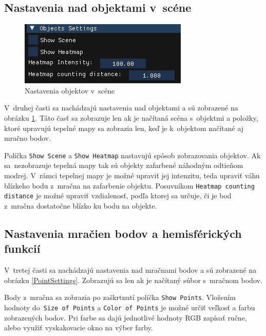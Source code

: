 \subsection*{Nastavenia nad objektami v~scéne}

\begin{figure}[t!] \label{ObjSettings}
    \centering
    \includegraphics[width=0.45\linewidth]{obrazky-figures/UI_scene.png}
    \caption{Nastavenia objektov v~scéne}
\end{figure}
V~druhej časti sa nachádzajú nastavenia nad objektami a sú zobrazené na obrázku \ref{ObjSettings}. Táto časť sa zobrazuje len ak je načítaná scéna s~objektmi a položky, ktoré upravujú tepelné mapy sa zobrazia len, keď je k~objektom načítané aj mračno bodov.

Políčka \verb|Show Scene| a \verb|Show Heatmap| nastavujú spôsob zobrazovania objektov. Ak sa~nezobrazuje tepelná mapy tak sú objekty zafarbené náhodným odtieňom modrej. V~rámci tepelnej mapy je možné upraviť jej intenzitu, teda upraviť váhu blízkeho bodu z~mračna na zafarbenie objektu. Posuvníkom \verb|Heatmap counting distance| je možné upraviť vzdialenosť, podľa ktorej sa určuje, či je bod z~mračna dostatočne blízko ku bodu na objekte.

\subsection*{Nastavenia mračien bodov a hemisférických funkcií}
V~tretej časti sa nachádzajú nastavenia nad mračnami bodov a sú zobrazené na obrázku \ref{PointSettings}. Zobrazujú sa len ak je načítaný súbor s~mračnom bodov. 

Body z~mračna sa zobrazia po zaškrtnutí políčka \verb|Show Points|. Vložením hodnoty do~\verb|Size of Points| a \verb|Color of Points| je možné určiť veľkosť a farbu zobrazených bodov. Pri farbe sa dajú jednotlivé hodnoty RGB zapísať ručne, alebo využiť vyskakovacie okno na výber farby.

